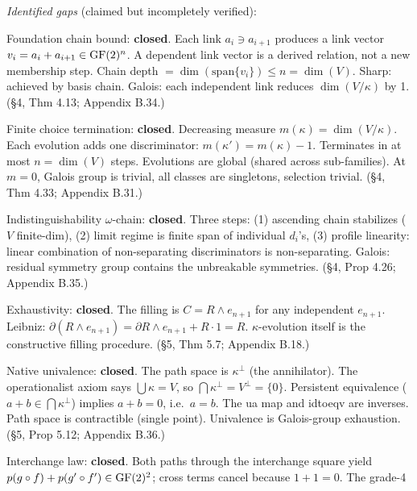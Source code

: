 \emph{Identified gaps} (claimed but incompletely verified):
\begin{description}[nosep,leftmargin=0.8cm]
  \item[G1] Foundation chain bound: \textbf{closed}.
    Each link $a_i \ni a_{i+1}$ produces a link vector
    $v_i = a_i + a_{i+1} \in \operatorname{GF}(2)^n$. A dependent
    link vector is a derived relation, not a new
    membership step. Chain depth $=
    \dim(\mathrm{span}\{v_i\}) \leq n = \dim(V)$.
    Sharp: achieved by basis chain. Galois: each
    independent link reduces $\dim(V/\kappa)$ by 1.
    (\S4, Thm 4.13; Appendix B.34.)
  \item[G2] Finite choice termination: \textbf{closed}.
    Decreasing measure $m(\kappa) = \dim(V/\kappa)$.
    Each evolution adds one discriminator:
    $m(\kappa') = m(\kappa) - 1$. Terminates in at most
    $n = \dim(V)$ steps. Evolutions are global (shared
    across sub-families). At $m = 0$, Galois group is
    trivial, all classes are singletons, selection trivial.
    (\S4, Thm 4.33; Appendix B.31.)
  \item[G3] Indistinguishability $\omega$-chain:
    \textbf{closed}. Three steps: (1) ascending chain
    stabilizes ($V$ finite-dim), (2) limit regime is
    finite span of individual $d_i$'s, (3) profile
    linearity: linear combination of non-separating
    discriminators is non-separating. Galois: residual
    symmetry group contains the unbreakable symmetries.
    (\S4, Prop 4.26; Appendix B.35.)
  \item[G4] Exhaustivity: \textbf{closed}. The filling
    is $C = R \wedge e_{n+1}$ for any independent $e_{n+1}$.
    Leibniz: $\partial(R \wedge e_{n+1}) = \partial R
    \wedge e_{n+1} + R \cdot 1 = R$. $\kappa$-evolution
    itself is the constructive filling procedure.
    (\S5, Thm 5.7; Appendix B.18.)
  \item[G5] Native univalence: \textbf{closed}. The
    path space is $\kappa^\perp$ (the annihilator). The
    operationalist axiom says $\bigcup \kappa = V$,
    so $\bigcap \kappa^\perp = V^\perp = \{0\}$.
    Persistent equivalence ($a + b \in \bigcap
    \kappa^\perp$) implies $a + b = 0$, i.e.\ $a = b$.
    The ua map and idtoeqv are inverses. Path space is
    contractible (single point). Univalence is
    Galois-group exhaustion.
    (\S5, Prop 5.12; Appendix B.36.)
  \item[G6] Interchange law: \textbf{closed}.
    Both paths through the interchange square yield
    $p(g \circ f) + p(g' \circ f') \in \operatorname{GF}(2)^2$;
    cross terms cancel because $1+1=0$. The grade-4

\end{description}
